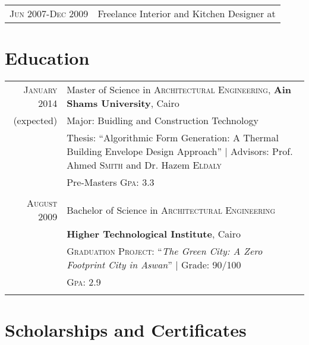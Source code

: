 \documentclass[a4paper,10pt]{article} %
\begin{document}
\begin{tabular}{r|p{11cm}}

\textsc{Jun 2007-Dec 2009} & Freelance Interior and Kitchen Designer at \emph{}\\
\end{tabular}


\section{Education}

\begin{tabular}{rl}	
\textsc{January} 2014 & Master of Science in \textsc{Architectural Engineering}, \textbf{Ain Shams University}, Cairo\\
(expected)& Major: Buidling and Construction Technology\\
& Thesis: ``Algorithmic Form Generation: A Thermal Building Envelope Design Approach'' | \small Advisors: Prof. Ahmed \textsc{Smith} and Dr. Hazem \textsc{Eldaly}\\
&\normalsize Pre-Masters \textsc{Gpa}: 3.3\\
&\\


\textsc{August} 2009& Bachelor of Science in \textsc{Architectural Engineering} \\
& \normalsize\textbf{Higher Technological Institute}, Cairo\\
& \textsc{Graduation Project:} ``\emph{The Green City: A Zero Footprint City in Aswan}'' | \small Grade: 90/100\\
&\normalsize \textsc{Gpa}: 2.9 \\
&\\

\end{tabular}


\section{Scholarships and Certificates}
\end{document}

